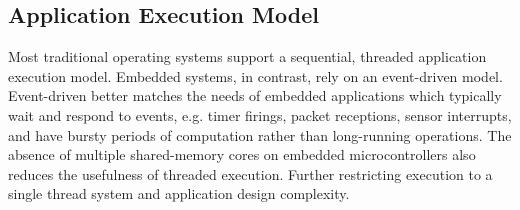 

\subsection{Application Execution Model}
\label{sec:os:execution}

Most traditional operating systems support a sequential, threaded application
execution model. Embedded systems, in contrast, rely on an event-driven model. 
Event-driven
better matches the needs of embedded applications which typically wait and
respond to events, e.g. timer firings, packet receptions, sensor interrupts,
and have bursty periods of computation rather than long-running operations.
The absence of multiple shared-memory cores on embedded microcontrollers also
reduces the usefulness of threaded execution. Further restricting execution to a
single thread system and application design complexity.


